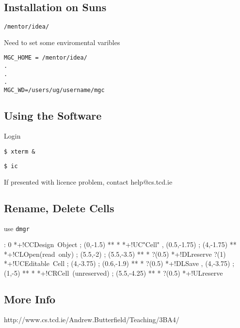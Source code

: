 \documentclass[a4paper,12pt]{article}
\begin{document}
\subsection*{Installation on Suns}

\verb!/mentor/idea/!

Need to set some enviromental varibles

\begin{verbatim}
MGC_HOME = /mentor/idea/
.
.
.
MGC_WD=/users/ug/username/mgc
\end{verbatim}

\subsection*{Using the Software}

Login

\verb!$ xterm &!

\verb!$ ic!

If presented with licence problem, contact help@cs.tcd.ie

\subsection*{Rename, Delete Cells}

use \verb!dmgr!

\begin{table}[h]

\xy <1cm,0cm>:
0 *+!CC{\mbox{Design Object}} ; (0,-1.5) **\dir{-} *\dir{>} *+!UC{\mbox{"Cell"}} ,
(0.5,-1.75) ; (4,-1.75) **\dir{-} *+!CL{\mbox{Open \\ (read only)}} ;
(5.5,-2) ; (5.5,-3.5) **\dir{-} *\dir{>} ?(0.5) *+!DL{\mbox{reserve}} ?(1) *+!UC{\mbox{Editable Cell}} ;
(4,-3.75) ; (0.6,-1.9) **\dir{-} *\dir{>} ?(0.5) *+!DL{\mbox{Save}} ,
(4,-3.75) ; (1,-5) **\dir{-} *\dir{>} *+!CR{\mbox{Cell (unreserved)}} ;
(5.5,-4.25) ** *\dir{>} ?(0.5) *+!UL{\mbox{reserve}}
\endxy

\end{table}

\subsection*{More Info}

http://www.cs.tcd.ie/Andrew.Butterfield/Teaching/3BA4/
\end{document}
